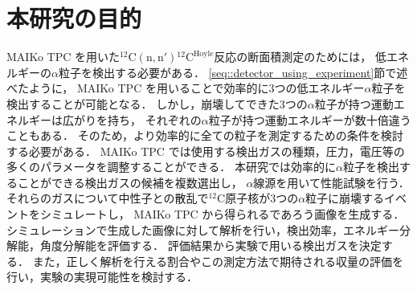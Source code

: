 \documentclass[../master]{subfiles}
\begin{document}

\section{本研究の目的}
MAIKo TPC を用いた${}^{12}\mathrm{C}(\mathrm{n},\mathrm{n}'){}^{12}\mathrm{C}^{\text{Hoyle}}$反応の断面積測定のためには，
低エネルギーの$\alpha$粒子を検出する必要がある．
\ref{seq::detector_using_experiment}節で述べたように，
MAIKo TPC を用いることで効率的に3つの低エネルギー$\alpha$粒子を検出することが可能となる．
しかし，崩壊してできた3つの$\alpha$粒子が持つ運動エネルギーは広がりを持ち，
それぞれの$\alpha$粒子が持つ運動エネルギーが数十倍違うこともある．
そのため，より効率的に全ての粒子を測定するための条件を検討する必要がある．
MAIKo TPC では使用する検出ガスの種類，圧力，電圧等の多くのパラメータを調整することができる．
本研究では効率的に$\alpha$粒子を検出することができる検出ガスの候補を複数選出し，
$\alpha$線源を用いて性能試験を行う．
それらのガスについて中性子との散乱で${}^{12}\mathrm{C}$原子核が3つの$\alpha$粒子に崩壊するイベントをシミュレートし，
MAIKo TPC から得られるであろう画像を生成する．
シミュレーションで生成した画像に対して解析を行い，検出効率，エネルギー分解能，角度分解能を評価する．
評価結果から実験で用いる検出ガスを決定する．
また，正しく解析を行える割合やこの測定方法で期待される収量の評価を行い，実験の実現可能性を検討する．
\end{document}
